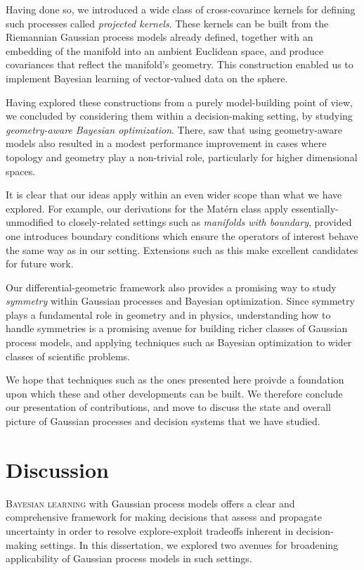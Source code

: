 \documentclass[11pt]{book}
\begin{document}
Having done so, we introduced a wide class of cross-covarince kernels for defining such processes called \emph{projected kernels}.
These kernels can be built from the Riemannian Gaussian process models already defined, together with an embedding of the manifold into an ambient Euclidean space, and produce covariances that reflect the manifold's geometry.
This construction enabled us to implement Bayesian learning of vector-valued data on the sphere.

Having explored these constructions from a purely model-building point of view, we concluded by considering them within a decision-making setting, by studying \emph{geometry-aware Bayesian optimization}.
There, saw that using geometry-aware models also resulted in a modest performance improvement in cases where topology and geometry play a non-trivial role, particularly for higher dimensional spaces.

It is clear that our ideas apply within an even wider scope than what we have explored.
For example, our derivations for the Matérn class apply essentially-unmodified to closely-related settings such as \emph{manifolds with boundary}, provided one introduces boundary conditions which ensure the operators of interest behave the same way as in our setting.
Extensions such as this make excellent candidates for future work.

Our differential-geometric framework also provides a promising way to study \emph{symmetry} within Gaussian processes and Bayesian optimization.
Since symmetry plays a fundamental role in geometry and in physics, understanding how to handle symmetries is a promising avenue for building richer classes of Gaussian process models, and applying techniques such as Bayesian optimization to wider classes of scientific problems.

We hope that techniques such as the ones presented here proivde a foundation upon which these and other developments can be built.
We therefore conclude our presentation of contributions, and move to discuss the state and overall picture of Gaussian processes and decision systems that we have studied.


\chapter{Discussion}
\label{ch:discussion}

\lettrine{B}{ayesian learning} with Gaussian process models offers a clear and comprehensive framework for making decisions that assess and propagate uncertainty in order to resolve explore-exploit tradeoffs inherent in decision-making settings.
In this dissertation, we explored two avenues for broadening applicability of Gaussian process models in such settings.
\end{document}
